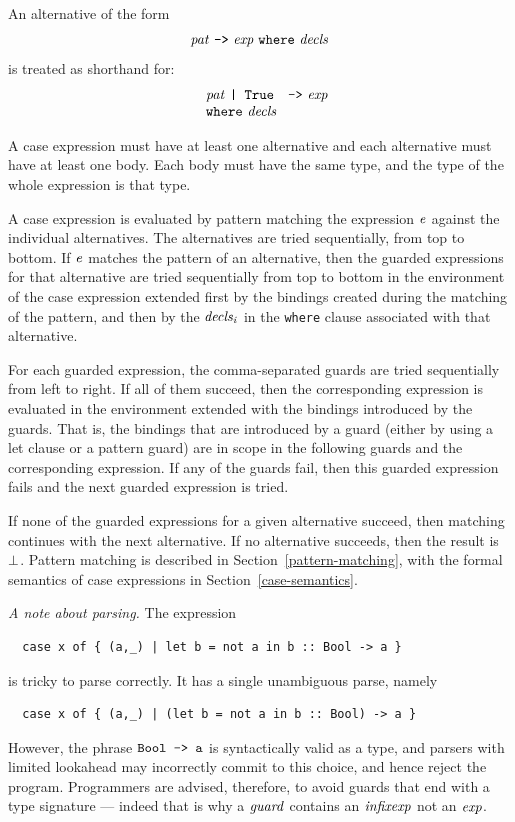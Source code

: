An alternative of the form
\[
\mbox{$\it pat\ \makebox{\tt ->}\ exp\ \makebox{\tt where}\ decls$}
\]
is treated as shorthand for:
\[\ba{lll}
 & \mbox{$\it pat\ \makebox{\tt |\ True}$}   & \mbox{$\it \makebox{\tt ->}\ exp$} \\
 & \multicolumn{2}{l}{\mbox{$\it \makebox{\tt where}\ decls$}}
\ea\]

A case expression must have at least one alternative and each alternative must
have at least one body.  Each body must have the same type, and the
type of the whole expression is that type.

A case expression is evaluated by pattern matching the expression \mbox{$\it e$}
against the individual alternatives.  The alternatives are tried
sequentially, from top to bottom.  If \mbox{$\it e$} matches the pattern of an
alternative, then the guarded expressions for that alternative are
tried sequentially from top to bottom in the environment of the case
expression extended first by the bindings created during the matching
of the pattern, and then by the \mbox{$\it decls_i$} in the \mbox{\tt where} clause
associated with that alternative.

\begin{haskellprime}
For each guarded expression, the comma-separated guards are tried
sequentially from left to right.  If all of them succeed, then the
corresponding expression is evaluated in the environment extended with
the bindings introduced by the guards.  That is, the bindings that are
introduced by a guard (either by using a let clause or a pattern
guard) are in scope in the following guards and the corresponding
expression.  If any of the guards fail, then this guarded expression
fails and the next guarded expression is tried.
\end{haskellprime}

If none of the guarded expressions for a given alternative succeed,
then matching continues with the next alternative.  If no alternative
succeeds, then the result is \mbox{$\it \bot$}.  Pattern matching is described in
Section~\ref{pattern-matching}, with the formal semantics of case
expressions in Section~\ref{case-semantics}.

{\em A note about parsing.} The expression
\bprog
{\small\begin{verbatim}
  case x of { (a,_) | let b = not a in b :: Bool -> a }
\end{verbatim}}
\eprog
is tricky to parse correctly.  It has a single unambiguous parse, namely
\bprog
{\small\begin{verbatim}
  case x of { (a,_) | (let b = not a in b :: Bool) -> a }
\end{verbatim}}
\eprog
However, the phrase \mbox{$\it \makebox{\tt Bool\ ->\ a}$} is syntactically valid as a type, and
parsers with limited lookahead may incorrectly commit to this choice, and hence
reject the program.  Programmers are advised, therefore, to avoid guards that
end with a type signature --- indeed that is why a \mbox{$\it guard$} contains 
an \mbox{$\it infixexp$} not an \mbox{$\it exp$}.

